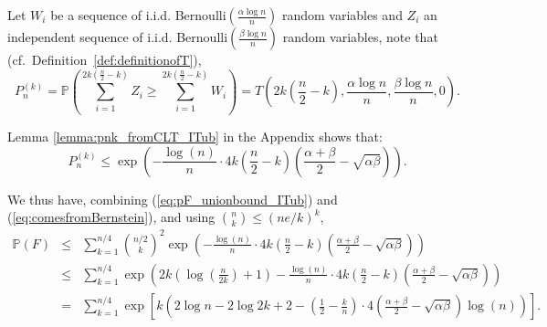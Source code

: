 \documentclass[english]{article}
\newcommand{\1}{\textbf{1}}
\newcommand{\p}{\mathbb{P}}
\begin{document}
Let $W_i$ be a sequence of i.i.d. Bernoulli$\left(\frac{\alpha \log n}n \right)$ random variables and $Z_i$ an independent sequence of i.i.d. Bernoulli$\left(\frac{\beta \log n}n \right)$ random variables, note that (cf.\ Definition~\ref{def:definitionofT}),
\[
P_n^{(k)} = \p\left( \sum_{i=1}^{2k\left(\frac{n}2-k\right)}Z_i \geq \sum_{i=1}^{2k\left(\frac{n}2-k\right)}W_i  \right) = T\left( 2k\left(\frac{n}2-k\right),\frac{\alpha\log n}{n},\frac{\beta\log n}{n},0\right).
\]


Lemma \ref{lemma:pnk_fromCLT_ITub} in the Appendix shows that:
\begin{equation}\label{eq:comesfromBernstein}
P_n^{(k)} \leq  \exp\left( - \frac{\log(n)}{n}\cdot 4k \left( \frac{n}{2}-k \right) \left( \frac{\alpha+\beta}{2} -\sqrt{\alpha \beta}\right) \right).
\end{equation}

We thus have, combining (\ref{eq:pF_unionbound_ITub}) and (\ref{eq:comesfromBernstein}), and using ${n\choose k} \leq (ne/k)^k$,
\begin{eqnarray}
\p(F) & \leq & \sum_{k=1}^{n/4} {n/2\choose k}^2 \exp\left(  - \frac{\log(n)}{n}\cdot 4k \left( \frac{n}{2}-k \right) \left( \frac{\alpha+\beta}{2} -\sqrt{\alpha \beta}\right)  \right)\nonumber\\
& \leq & \sum_{k=1}^{n/4}  \exp\left( 2k\left(\log\left(\frac{n}{2k} \right)+1\right)  - \frac{\log(n)}{n}\cdot 4k \left( \frac{n}{2}-k \right) \left( \frac{\alpha+\beta}{2} -\sqrt{\alpha \beta}\right)  \right)\nonumber\\
& = & \sum_{k=1}^{n/4}  \exp\left[k\left( 2 \log n - 2\log 2k + 2 - \left(\frac{1}2-\frac{k}n\right) \cdot 4\left( \frac{\alpha+\beta}{2} -\sqrt{\alpha \beta}\right) \log(n) \right)\right]. \label{eq:outsidelemmaboundpf5_IT_ub}
\end{eqnarray}
\end{document}
